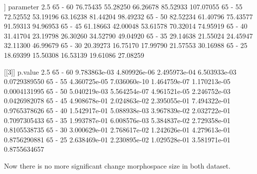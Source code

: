 \documentclass{article}
\begin{document}
\begin{Schunk}
\begin{Soutput}
[[2]]
        parameter     2.5%      25%      75%     97.5%
65 - 60  76.75435 55.28250 66.26678 85.52933 107.07055
65 - 55  72.52552 53.19196 63.16238 81.44204  98.49232
65 - 50  82.52234 61.40796 75.43577 91.59313  94.96953
65 - 45  61.18663 42.00048 53.61578 70.32014  74.95919
65 - 40  31.41704 23.19798 26.30260 34.52790  49.04920
65 - 35  29.14638 21.55024 24.45947 32.11300  46.99679
65 - 30  20.39273 16.75170 17.99790 21.57553  30.16988
65 - 25  18.69399 15.50308 16.53139 19.61086  27.08259

[[3]]
             p.value         2.5%          25%          75%        97.5%
65 - 60 9.783863e-03 4.809926e-06 2.495973e-04 6.503933e-03 0.0729389550
65 - 55 4.360725e-05 7.036060e-10 1.464759e-07 1.170213e-05 0.0004131995
65 - 50 5.040219e-03 5.564254e-07 4.961521e-05 2.246752e-03 0.0426982078
65 - 45 4.908678e-01 2.024863e-02 2.395055e-01 7.494322e-01 0.9765378626
65 - 40 1.542917e-01 5.088938e-03 3.967839e-02 2.032722e-01 0.7097305433
65 - 35 1.993787e-01 6.008576e-03 5.384837e-02 2.729358e-01 0.8105538735
65 - 30 3.000629e-01 2.768617e-02 1.242626e-01 4.279613e-01 0.8756290881
65 - 25 2.638469e-01 2.230895e-02 1.029528e-01 3.581971e-01 0.8755634657
\end{Soutput}
\end{Schunk}

Now there is no more significant change morphospace size in both dataset.
\end{document}
